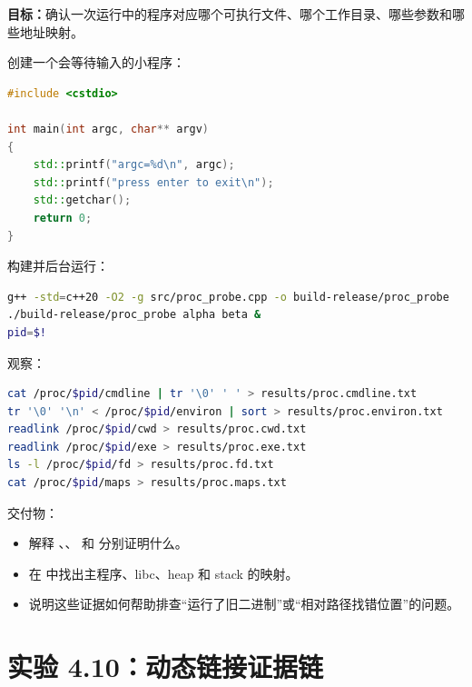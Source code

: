 \begin{labbox}
\textbf{目标：}确认一次运行中的程序对应哪个可执行文件、哪个工作目录、哪些参数和哪些地址映射。

创建一个会等待输入的小程序：

\begin{lstlisting}[language=C++]
#include <cstdio>

int main(int argc, char** argv)
{
    std::printf("argc=%d\n", argc);
    std::printf("press enter to exit\n");
    std::getchar();
    return 0;
}
\end{lstlisting}

构建并后台运行：

\begin{lstlisting}[language=bash]
g++ -std=c++20 -O2 -g src/proc_probe.cpp -o build-release/proc_probe
./build-release/proc_probe alpha beta &
pid=$!
\end{lstlisting}

观察：

\begin{lstlisting}[language=bash]
cat /proc/$pid/cmdline | tr '\0' ' ' > results/proc.cmdline.txt
tr '\0' '\n' < /proc/$pid/environ | sort > results/proc.environ.txt
readlink /proc/$pid/cwd > results/proc.cwd.txt
readlink /proc/$pid/exe > results/proc.exe.txt
ls -l /proc/$pid/fd > results/proc.fd.txt
cat /proc/$pid/maps > results/proc.maps.txt
\end{lstlisting}

交付物：

\begin{itemize}
  \item 解释 、、 和  分别证明什么。
  \item 在  中找出主程序、libc、heap 和 stack 的映射。
  \item 说明这些证据如何帮助排查“运行了旧二进制”或“相对路径找错位置”的问题。
\end{itemize}
\end{labbox}

\section{实验 4.10：动态链接证据链}

